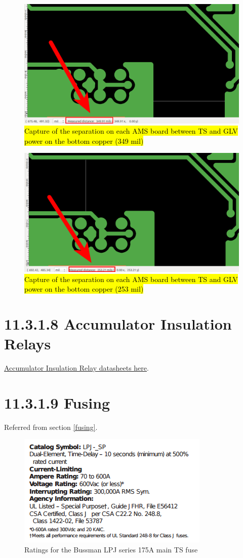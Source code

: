 \documentclass{article}
\DeclareRobustCommand{\hlr}[1]{{\sethlcolor{red}\hl{#1}}}
\begin{document}
\begin{figure}[H]
 \centering
 \includegraphics[width = 0.4 \textwidth]{bmsspace4}
 \caption{\hlr{Capture of the separation on each AMS board between TS and GLV power on the bottom copper (349 mil)}}
 \label{amsseparation4}
\end{figure}

\begin{figure}[H]
 \centering
 \includegraphics[width = 0.4 \textwidth]{bmsspace5}
 \caption{\hlr{Capture of the separation on each AMS board between TS and GLV power on the bottom copper (253 mil)}}
 \label{amsseparation5}
\end{figure}

\section*{11.3.1.8 Accumulator Insulation Relays}

\href{http://www.rec-bms.com/datasheet/Technical_datasheet_Kilovac.pdf}{Accumulator Insulation Relay datasheets here}.

\section*{11.3.1.9 Fusing} \label{fusingappendix}

Referred from section \ref{fusing}.

\begin{figure}[H]
    \centering
    \includegraphics[width = 0.5 \textwidth]{TSmainratings}
    \caption{Ratings for the Bussman LPJ series 175A main TS fuse}
    \label{mainTSfuseratings}
\end{figure}
\end{document}
